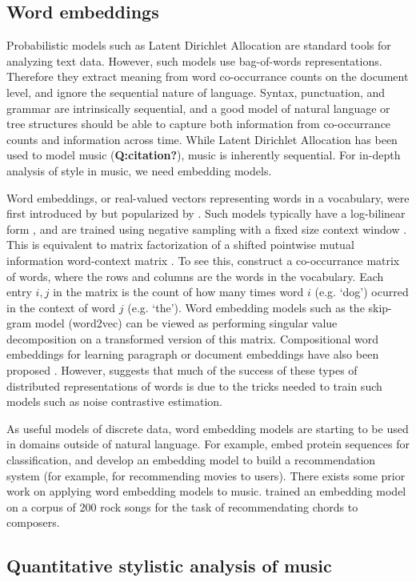 
\subsection{Word embeddings}
Probabilistic models such as Latent Dirichlet Allocation \cite{Blei2003} are standard tools for analyzing text data. However, such models use bag-of-words representations. Therefore they extract meaning from word co-occurrance counts on the document level, and ignore the sequential nature of language. Syntax, punctuation, and grammar are intrinsically sequential, and a good model of natural language or tree structures should be able to capture both information from co-occurrance counts and information across time. While Latent Dirichlet Allocation has been used to model music (\textbf{Q:citation?}), music is inherently sequential. For in-depth analysis of style in music, we need embedding models.

Word embeddings, or real-valued vectors representing words in a vocabulary, were first introduced by \cite{Bengio2003} but popularized by \cite{Mikolov2013a}. Such models typically have a log-bilinear form \cite{Mnih2007}, and are trained using negative sampling with a fixed size context window \cite{Mikolov2013a}. This is equivalent to matrix factorization of a shifted pointwise mutual information word-context matrix \cite{Levy}. To see this, construct a co-occurrance matrix of words, where the rows and columns are the words in the vocabulary. Each entry $i, j$ in the matrix is the count of how many times word $i$ (e.g. `dog') ocurred in the context of word $j$ (e.g. `the'). Word embedding models such as the skip-gram model (word2vec) can be viewed as performing singular value decomposition on a transformed version of this matrix.  Compositional word embeddings for learning paragraph or document embeddings have also been proposed \cite{Le2014,Dai2015}. However, \cite{Levy2015a} suggests that much of the success of these types of distributed representations of words is due to the tricks needed to train such models such as noise contrastive estimation.


As useful models of discrete data, word embedding models are starting to be used in domains outside of natural language. For example, \cite{Asgari2015} embed protein sequences for classification, and \cite{Guardia-Sebaoun2015} develop an embedding model to build a recommendation system (for example, for recommending movies to users).
There exists some prior work on applying word embedding models to music. \cite{Name2015} trained an embedding model on a corpus of 200 rock songs for the task of recommendating chords to composers.

\subsection{Quantitative stylistic analysis of music}